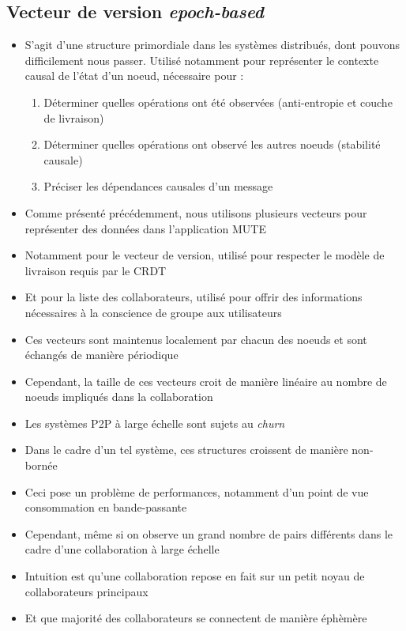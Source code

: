 \documentclass[12pt]{thesul}
\theoremstyle{definition}
\begin{document}
\subsection{Vecteur de version \emph{epoch-based}}

\begin{itemize}
  \item S'agit d'une structure primordiale dans les systèmes distribués, dont pouvons difficilement nous passer.
    Utilisé notamment pour représenter le contexte causal de l'état d'un noeud, nécessaire pour :
    \begin{enumerate}
      \item Déterminer quelles opérations ont été observées (anti-entropie et couche de livraison)
      \item Déterminer quelles opérations ont observé les autres noeuds (stabilité causale)
      \item Préciser les dépendances causales d'un message
    \end{enumerate}
  \item Comme présenté précédemment, nous utilisons plusieurs vecteurs pour représenter des données dans l'application MUTE
  \item Notamment pour le vecteur de version, utilisé pour respecter le modèle de livraison requis par le \ac{CRDT}
  \item Et pour la liste des collaborateurs, utilisé pour offrir des informations nécessaires à la conscience de groupe aux utilisateurs
  \item Ces vecteurs sont maintenus localement par chacun des noeuds et sont échangés de manière périodique
  \item Cependant, la taille de ces vecteurs croit de manière linéaire au nombre de noeuds impliqués dans la collaboration
  \item Les systèmes \ac{P2P} à large échelle sont sujets au \emph{churn}
  \item Dans le cadre d'un tel système, ces structures croissent de manière non-bornée
  \item Ceci pose un problème de performances, notamment d'un point de vue consommation en bande-passante
  \item Cependant, même si on observe un grand nombre de pairs différents dans le cadre d'une collaboration à large échelle
  \item Intuition est qu'une collaboration repose en fait sur un petit noyau de collaborateurs principaux
  \item Et que majorité des collaborateurs se connectent de manière éphèmère

\end{itemize}
\end{document}
